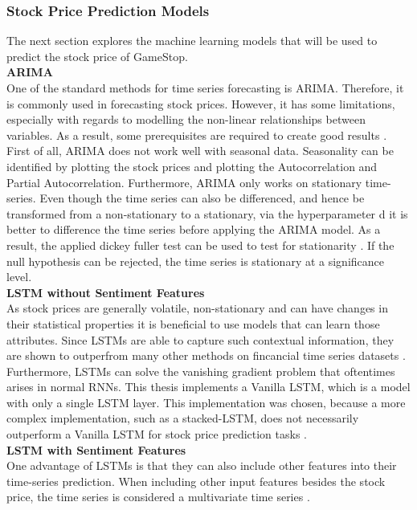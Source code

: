 \documentclass[11pt, a4paper]{article}
\begin{document}
\subsubsection{Stock Price Prediction Models}
The next section explores the machine learning models that will be used to predict the stock price of GameStop. \\

\noindent\textbf{ARIMA}\\
One of the standard methods for time series forecasting is ARIMA. Therefore, it is commonly used in forecasting stock prices.
However, it has some limitations, especially with regards to modelling the non-linear relationships between variables. As a result,
some prerequisites are required to create good results \citep{sima2018timeseries}.
First of all, ARIMA does not work well with seasonal data. Seasonality can be identified by plotting the stock prices and plotting
the Autocorrelation and Partial Autocorrelation.
Furthermore, ARIMA only works on stationary time-series. Even though the time series can also be differenced, and hence be transformed from
a non-stationary to a stationary, via the hyperparameter d it is better to difference the time series before applying the ARIMA model.
As a result, the applied dickey fuller test can be used to test for stationarity \citep{jain2017ASO}. If the null hypothesis can be rejected, the time series is stationary at a significance level. \\

\noindent\textbf{LSTM without Sentiment Features}\\
As stock prices are generally volatile, non-stationary and can have changes in their statistical properties it is beneficial to use
models that can learn those attributes. Since LSTMs are able to capture such contextual information, they are shown to outperfrom many other methods
on fincancial time series datasets \citep{preeti2019lstm}. Furthermore, LSTMs can solve the vanishing gradient problem that oftentimes arises in
normal RNNs. This thesis implements a Vanilla LSTM, which is a model with only a single LSTM layer. This implementation was chosen, because a more complex
implementation, such as a stacked-LSTM, does not necessarily outperform a Vanilla LSTM for stock price prediction tasks \citep{hai2020lstms}. \\


\noindent\textbf{LSTM with Sentiment Features}\\
One advantage of LSTMs is that they can also include other features into their time-series prediction.
When including other input features besides the stock price, the time series is considered a multivariate time series \citep{liu2019multivariate}. \\
\end{document}
